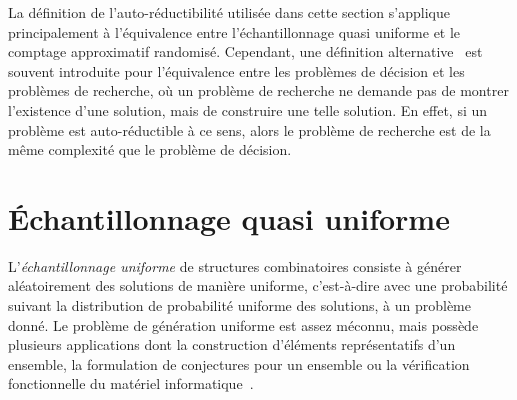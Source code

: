 La définition de l'auto-réductibilité utilisée dans cette section s'applique principalement à l'équivalence entre l'échantillonnage quasi uniforme et le comptage approximatif randomisé. Cependant, une définition alternative~\cite{goldreichComputationalComplexityConceptual2008} est souvent introduite pour l'équivalence entre les problèmes de décision et les problèmes de recherche, où un problème de recherche ne demande pas de montrer l'existence d'une solution, mais de construire une telle solution. En effet, si un problème est auto-réductible à ce sens, alors le problème de recherche est de la même complexité que le problème de décision. 



\section{Échantillonnage quasi uniforme}
\label{sec:echantillonnage-quasi-uniforme}

L'\textit{échantillonnage uniforme} de structures combinatoires consiste à générer aléatoirement des solutions de manière uniforme, c'est-à-dire avec une probabilité suivant la distribution de probabilité uniforme des solutions, à un problème donné. Le problème de génération uniforme est assez méconnu, mais possède plusieurs applications dont la construction d'éléments représentatifs d'un ensemble, la formulation de conjectures pour un ensemble ou la vérification fonctionnelle du matériel informatique~\cite{jerrumFastUniformGeneration1990, chakrabortyScalableNearlyUniform2013}.

